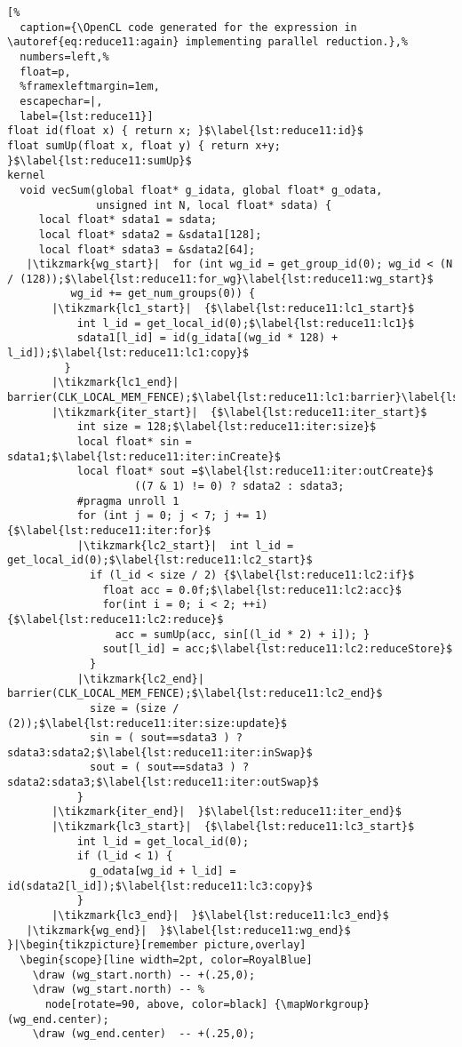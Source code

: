 \begin{lstlisting}[%
  caption={\OpenCL code generated for the expression in \autoref{eq:reduce11:again} implementing parallel reduction.},%
  numbers=left,%
  float=p,
  %framexleftmargin=1em,
  escapechar=|,
  label={lst:reduce11}]
float id(float x) { return x; }$\label{lst:reduce11:id}$
float sumUp(float x, float y) { return x+y; }$\label{lst:reduce11:sumUp}$
kernel
  void vecSum(global float* g_idata, global float* g_odata,
              unsigned int N, local float* sdata) {
     local float* sdata1 = sdata;
     local float* sdata2 = &sdata1[128];
     local float* sdata3 = &sdata2[64];
   |\tikzmark{wg_start}|  for (int wg_id = get_group_id(0); wg_id < (N / (128));$\label{lst:reduce11:for_wg}\label{lst:reduce11:wg_start}$
          wg_id += get_num_groups(0)) {
       |\tikzmark{lc1_start}|  {$\label{lst:reduce11:lc1_start}$
           int l_id = get_local_id(0);$\label{lst:reduce11:lc1}$
           sdata1[l_id] = id(g_idata[(wg_id * 128) + l_id]);$\label{lst:reduce11:lc1:copy}$
         }
       |\tikzmark{lc1_end}|  barrier(CLK_LOCAL_MEM_FENCE);$\label{lst:reduce11:lc1:barrier}\label{lst:reduce11:lc1_end}$
       |\tikzmark{iter_start}|  {$\label{lst:reduce11:iter_start}$
           int size = 128;$\label{lst:reduce11:iter:size}$
           local float* sin = sdata1;$\label{lst:reduce11:iter:inCreate}$
           local float* sout =$\label{lst:reduce11:iter:outCreate}$
                    ((7 & 1) != 0) ? sdata2 : sdata3;
           #pragma unroll 1
           for (int j = 0; j < 7; j += 1) {$\label{lst:reduce11:iter:for}$
           |\tikzmark{lc2_start}|  int l_id = get_local_id(0);$\label{lst:reduce11:lc2_start}$
             if (l_id < size / 2) {$\label{lst:reduce11:lc2:if}$
               float acc = 0.0f;$\label{lst:reduce11:lc2:acc}$
               for(int i = 0; i < 2; ++i) {$\label{lst:reduce11:lc2:reduce}$
                 acc = sumUp(acc, sin[(l_id * 2) + i]); }
               sout[l_id] = acc;$\label{lst:reduce11:lc2:reduceStore}$
             }
           |\tikzmark{lc2_end}|  barrier(CLK_LOCAL_MEM_FENCE);$\label{lst:reduce11:lc2_end}$
             size = (size / (2));$\label{lst:reduce11:iter:size:update}$
             sin = ( sout==sdata3 ) ? sdata3:sdata2;$\label{lst:reduce11:iter:inSwap}$
             sout = ( sout==sdata3 ) ? sdata2:sdata3;$\label{lst:reduce11:iter:outSwap}$
           }
       |\tikzmark{iter_end}|  }$\label{lst:reduce11:iter_end}$
       |\tikzmark{lc3_start}|  {$\label{lst:reduce11:lc3_start}$
           int l_id = get_local_id(0);
           if (l_id < 1) {
             g_odata[wg_id + l_id] = id(sdata2[l_id]);$\label{lst:reduce11:lc3:copy}$
           }
       |\tikzmark{lc3_end}|  }$\label{lst:reduce11:lc3_end}$
   |\tikzmark{wg_end}|  }$\label{lst:reduce11:wg_end}$
}|\begin{tikzpicture}[remember picture,overlay]
  \begin{scope}[line width=2pt, color=RoyalBlue]
    \draw (wg_start.north) -- +(.25,0);
    \draw (wg_start.north) -- %
      node[rotate=90, above, color=black] {\mapWorkgroup} (wg_end.center);
    \draw (wg_end.center)  -- +(.25,0);


\end{lstlisting}
